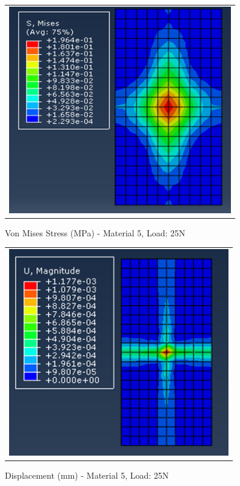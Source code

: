 \documentclass[a4paper,12pt]{article}
\numberwithin{equation}{section}
\numberwithin{figure}{section}
\begin{document}
\begin{figure}[H]
  \centering
  \begin{tabular}{@{}c@{}}
    \includegraphics[width=0.7\linewidth,height=255pt]{Results/Point Loading/M5_VMS_L5.png} \\
  \end{tabular}
  \caption{Von Mises Stress (MPa) - Material 5, Load: 25N}
\end{figure}

\begin{figure}[H]
  \centering
  \begin{tabular}{@{}c@{}}
    \includegraphics[width=0.7\linewidth,height=255pt]{Results/Point Loading/M5_DIS_L5.png} \\
  \end{tabular}
  \caption{Displacement (mm) - Material 5, Load: 25N}
\end{figure}
\end{document}
